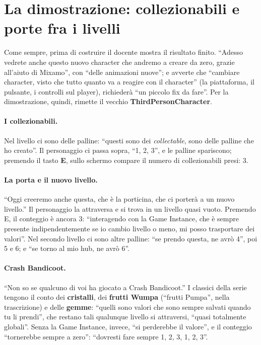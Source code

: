 \section{La dimostrazione: collezionabili e porte fra i livelli}
\label{ue8:sec:demo}

Come sempre, prima di costruire il docente mostra il risultato finito. ``Adesso vedrete
anche questo nuovo character che andremo a creare da zero, grazie all'aiuto di Mixamo'',
con ``delle animazioni nuove''; e avverte che ``cambiare character, visto che tutto
quanto va a reagire con il character'' (la piattaforma, il pulsante, i controlli sul
player), richiederà ``un piccolo fix da fare''. Per la dimostrazione, quindi, rimette il
vecchio \textbf{ThirdPersonCharacter}.

\paragraph{I collezionabili.} Nel livello ci sono delle palline: ``questi sono dei
\emph{collectable}, sono delle palline che ho creato''. Il personaggio ci passa sopra,
``1, 2, 3'', e le palline spariscono; premendo il tasto \textbf{E}, sullo schermo
compare il numero di collezionabili presi: 3.

\paragraph{La porta e il nuovo livello.} ``Oggi creeremo anche questa, che è la
porticina, che ci porterà a un nuovo livello.'' Il personaggio la attraversa e si trova
in un livello quasi vuoto. Premendo E, il conteggio è ancora 3: ``interagendo con la Game
Instance, che è sempre presente indipendentemente se io cambio livello o meno, mi posso
trasportare dei valori''. Nel secondo livello ci sono altre palline: ``se prendo questa,
ne avrò 4'', poi 5 e 6; e ``se torno al mio hub, ne avrò 6''.

\paragraph{Crash Bandicoot.} ``Non so se qualcuno di voi ha giocato a Crash Bandicoot.''
I classici della serie tengono il conto dei \textbf{cristalli}, dei \textbf{frutti Wumpa}
(``frutti Pumpa'', nella trascrizione) e delle \textbf{gemme}: ``quelli sono valori che
sono sempre salvati quando tu li prendi'', che restano tali qualunque livello si
attraversi, ``quasi totalmente globali''. Senza la Game Instance, invece, ``si
perderebbe il valore'', e il conteggio ``tornerebbe sempre a zero'': ``dovresti fare
sempre 1, 2, 3, 1, 2, 3''.

